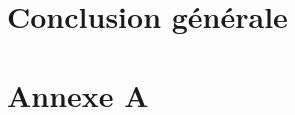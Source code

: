\documentclass[12pt, french]{report}
\begin{document}
%
%
%



\newpage

\chapter{Conclusion générale}

\newpage

\appendix
\chapter{Annexe A}

\end{document}
